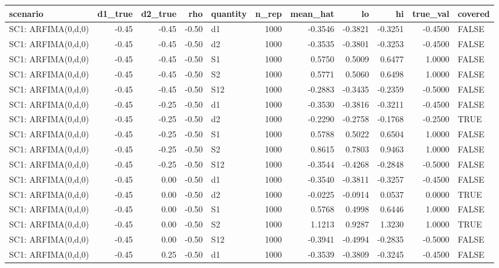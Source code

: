 \begin{table}[ht]
\centering
\begin{tabular}{lrrrlrrrrrl}
  \hline
scenario & d1\_true & d2\_true & rho & quantity & n\_rep & mean\_hat & lo & hi & true\_val & covered \\ 
  \hline
SC1: ARFIMA(0,d,0) & -0.45 & -0.45 & -0.50 & d1 & 1000 & -0.3546 & -0.3821 & -0.3251 & -0.4500 & FALSE \\ 
  SC1: ARFIMA(0,d,0) & -0.45 & -0.45 & -0.50 & d2 & 1000 & -0.3535 & -0.3801 & -0.3253 & -0.4500 & FALSE \\ 
  SC1: ARFIMA(0,d,0) & -0.45 & -0.45 & -0.50 & S1 & 1000 & 0.5750 & 0.5009 & 0.6477 & 1.0000 & FALSE \\ 
  SC1: ARFIMA(0,d,0) & -0.45 & -0.45 & -0.50 & S2 & 1000 & 0.5771 & 0.5060 & 0.6498 & 1.0000 & FALSE \\ 
  SC1: ARFIMA(0,d,0) & -0.45 & -0.45 & -0.50 & S12 & 1000 & -0.2883 & -0.3435 & -0.2359 & -0.5000 & FALSE \\ 
  SC1: ARFIMA(0,d,0) & -0.45 & -0.25 & -0.50 & d1 & 1000 & -0.3530 & -0.3816 & -0.3211 & -0.4500 & FALSE \\ 
  SC1: ARFIMA(0,d,0) & -0.45 & -0.25 & -0.50 & d2 & 1000 & -0.2290 & -0.2758 & -0.1768 & -0.2500 & TRUE \\ 
  SC1: ARFIMA(0,d,0) & -0.45 & -0.25 & -0.50 & S1 & 1000 & 0.5788 & 0.5022 & 0.6504 & 1.0000 & FALSE \\ 
  SC1: ARFIMA(0,d,0) & -0.45 & -0.25 & -0.50 & S2 & 1000 & 0.8615 & 0.7803 & 0.9463 & 1.0000 & FALSE \\ 
  SC1: ARFIMA(0,d,0) & -0.45 & -0.25 & -0.50 & S12 & 1000 & -0.3544 & -0.4268 & -0.2848 & -0.5000 & FALSE \\ 
  SC1: ARFIMA(0,d,0) & -0.45 & 0.00 & -0.50 & d1 & 1000 & -0.3540 & -0.3811 & -0.3257 & -0.4500 & FALSE \\ 
  SC1: ARFIMA(0,d,0) & -0.45 & 0.00 & -0.50 & d2 & 1000 & -0.0225 & -0.0914 & 0.0537 & 0.0000 & TRUE \\ 
  SC1: ARFIMA(0,d,0) & -0.45 & 0.00 & -0.50 & S1 & 1000 & 0.5768 & 0.4998 & 0.6446 & 1.0000 & FALSE \\ 
  SC1: ARFIMA(0,d,0) & -0.45 & 0.00 & -0.50 & S2 & 1000 & 1.1213 & 0.9287 & 1.3230 & 1.0000 & TRUE \\ 
  SC1: ARFIMA(0,d,0) & -0.45 & 0.00 & -0.50 & S12 & 1000 & -0.3941 & -0.4994 & -0.2835 & -0.5000 & FALSE \\ 
  SC1: ARFIMA(0,d,0) & -0.45 & 0.25 & -0.50 & d1 & 1000 & -0.3539 & -0.3809 & -0.3245 & -0.4500 & FALSE \\ 

\end{tabular}
\end{table}
